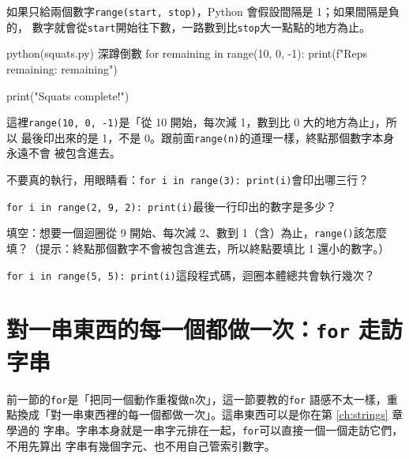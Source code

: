 如果只給兩個數字\texttt{range(start, stop)}，Python 會假設間隔是 1；如果間隔是負的，
數字就會從\texttt{start}開始往下數，一路數到比\texttt{stop}大一點點的地方為止。

\begin{example}{python}{(squats.py) 深蹲倒數}
for remaining in range(10, 0, -1):
    print(f"Reps remaining: {remaining}")

print("Squats complete!")
\end{example}


這裡\texttt{range(10, 0, -1)}是「從 10 開始，每次減 1，數到比 0 大的地方為止」，所以
最後印出來的是 1，不是 0。跟前面\texttt{range(n)}的道理一樣，終點那個數字本身永遠不會
被包含進去。

\begin{drills}[label=drills:for-range]
\item 不要真的執行，用眼睛看：\texttt{for i in range(3): print(i)}會印出哪三行？
\item \texttt{for i in range(2, 9, 2): print(i)}最後一行印出的數字是多少？
\item 填空：想要一個迴圈從 9 開始、每次減 2、數到 1（含）為止，\texttt{range()}該怎麼
填？（提示：終點那個數字不會被包含進去，所以終點要填比 1 還小的數字。）
\item \texttt{for i in range(5, 5): print(i)}這段程式碼，迴圈本體總共會執行幾次？
\end{drills}

\section{對一串東西的每一個都做一次：\texttt{for} 走訪字串}
\label{sec:for-string}

前一節的\texttt{for}是「把同一個動作重複做\texttt{n}次」，這一節要教的\texttt{for}
語感不太一樣，重點換成「對一串東西裡的每一個都做一次」。這串東西可以是你在第 \ref{ch:strings} 章學過的
字串。字串本身就是一串字元排在一起，\texttt{for}可以直接一個一個走訪它們，不用先算出
字串有幾個字元、也不用自己管索引數字。

